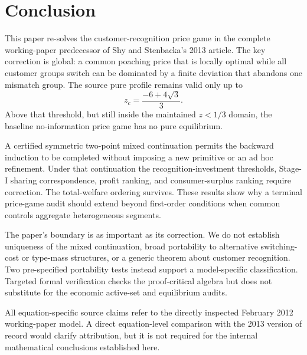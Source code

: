 \section{Conclusion}\label{sec:conclusion}

This paper re-solves the customer-recognition price game in the complete working-paper predecessor of Shy and Stenbacka's 2013 article.  The key correction is global: a common poaching price that is locally optimal while all customer groups switch can be dominated by a finite deviation that abandons one mismatch group.  The source pure profile remains valid only up to
\[
z_c=\frac{-6+4\sqrt3}{3}.
\]
Above that threshold, but still inside the maintained \(z<1/3\) domain, the baseline no-information price game has no pure equilibrium.

A certified symmetric two-point mixed continuation permits the backward induction to be completed without imposing a new primitive or an ad hoc refinement.  Under that continuation the recognition-investment thresholds, Stage-I sharing correspondence, profit ranking, and consumer-surplus ranking require correction.  The total-welfare ordering survives.  These results show why a terminal price-game audit should extend beyond first-order conditions when common controls aggregate heterogeneous segments.

The paper's boundary is as important as its correction.  We do not establish uniqueness of the mixed continuation, broad portability to alternative switching-cost or type-mass structures, or a generic theorem about customer recognition.  Two pre-specified portability tests instead support a model-specific classification.  Targeted formal verification checks the proof-critical algebra but does not substitute for the economic active-set and equilibrium audits.

All equation-specific source claims refer to the directly inspected February 2012 working-paper model.  A direct equation-level comparison with the 2013 version of record would clarify attribution, but it is not required for the internal mathematical conclusions established here.

